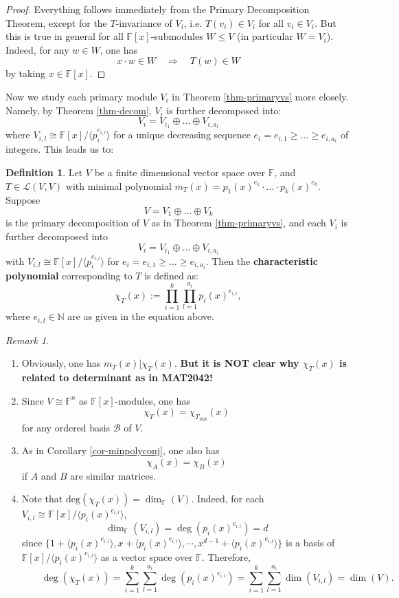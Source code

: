 \documentclass[11pt,openany]{book}
\theoremstyle{plain}
\theoremstyle{definition}
\newtheorem{definition}[definition]{Definition}
\theoremstyle{remark}
\newtheorem{remark}[remark]{Remark}
\begin{document}
\begin{proof}
   Everything follows immediately from the Primary Decomposition Theorem, except for the $T$-invariance of $V_i$, i.e. $T(v_i) \in V_i$ for all $v_i \in V_i$. 
    But this is true in general for all $\mathbb{F}[x]$-submodules $W \leq V$ (in particular $W = V_i$). Indeed, for any $w \in W$, one has
   $$x \cdot w \in W \quad \Rightarrow \quad  T(w) \in W$$
   by taking $x \in \mathbb{F}[x]$.
\end{proof}


Now we study each primary module $V_i$ in Theorem \ref{thm-primaryvs} more closely. Namely, by Theorem \ref{thm-decom}, $V_i$ is further decomposed into:
$$V_i = V_{i_1} \oplus \dots \oplus V_{i,a_i}$$
where $V_{i,l} \cong \mathbb{F}[x]/\langle p_i^{e_{i,l}} \rangle$ for 
a unique decreasing sequence $e_i = e_{i,1} \geq \dots \geq e_{i,a_i}$ of integers. This leads us to:
\begin{definition}
    Let $V$ be a finite dimensional vector space over $\mathbb{F}$, and $T \in \mathcal{L}(V,V)$ with minimal polynomial $m_T(x) = p_1(x)^{e_1} \cdot \dots \cdot p_k(x)^{e_k}$. Suppose
    $$V = V_1 \oplus \dots \oplus V_k$$
    is the primary decomposition of $V$ as in Theorem \ref{thm-primaryvs}, and each $V_i$ is further decomposed into 
    $$V_i = V_{i_1} \oplus \dots \oplus V_{i,a_i}$$ 
    with $V_{i,l} \cong \mathbb{F}[x]/\langle p_i^{e_{i,l}} \rangle$ for $e_i = e_{i,1} \geq \dots \geq e_{i,a_i}$. Then the {\bf characteristic polynomial} corresponding to $T$ is defined as:
    $$\chi_T(x) := \prod_{i = 1}^k \prod_{l = 1}^{a_i} p_i(x)^{e_{i,l}},$$
    where $e_{i,l} \in \mathbb{N}$ are as given in the equation above.
\end{definition}

\begin{remark}
    \begin{enumerate}
        \item Obviously, one has $m_T(x) | \chi_T(x)$. {\bf But it is NOT clear why $\chi_T(x)$ is related to determinant as in MAT2042!}
        \item Since $V \cong \mathbb{F}^n$ as $\mathbb{F}[x]$-modules, one has $$\chi_T(x) = \chi_{T_{\mathcal{B}\mathcal{B}}}(x)$$
        for any ordered basis $\mathcal{B}$ of $V$.
        \item As in Corollary \ref{cor-minpolyconj}, one also has
        $$ \chi_{A}(x) = \chi_{B}(x)$$
        if $A$ and $B$ are similar matrices.
        \item Note that $\mathrm{deg}(\chi_{T}(x)) = \dim_{\mathbb{F}}(V)$. Indeed, for each $V_{i,l} \cong \mathbb{F}[x]/\langle p_i(x)^{e_{i,l}} \rangle$, 
        $$\dim_{\mathbb{F}}(V_{i,l}) = \deg(p_i(x)^{e_{i,l}}) = d$$
        since $\{1 + \langle p_i(x)^{e_{i,l}} \rangle, x + \langle p_i(x)^{e_{i,l}} \rangle, \cdots, x^{d-1} + \langle p_i(x)^{e_{i,l}} \rangle\}$ is a basis of $\mathbb{F}[x]/\langle p_i(x)^{e_{i,l}} \rangle$ as a vector space over $\mathbb{F}$. Therefore,
        $$\quad \quad \deg(\chi_T(x)) = \sum_{i=1}^k \sum_{l=1}^{a_i} \deg(p_i(x)^{e_{i,l}}) = \sum_{i=1}^k \sum_{l=1}^{a_i} \dim(V_{i,l}) = \dim(V).$$
    \end{enumerate}
\end{remark}
\end{document}
